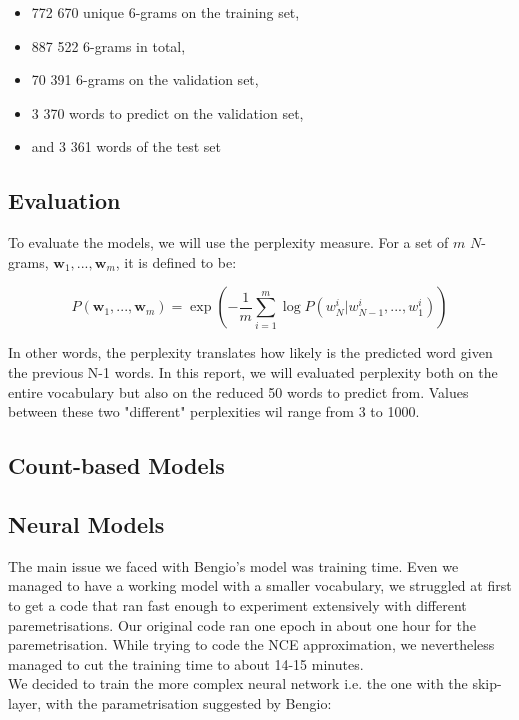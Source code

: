 \documentclass[11pt]{article}
\begin{document}
\begin{itemize}
\item 772 670 unique 6-grams on the training set,
\item 887 522 6-grams in total,
\item 70 391 6-grams on the validation set,
\item 3 370 words to predict on the validation set,
\item and 3 361 words of the test set
\end{itemize}

\subsection{Evaluation}

To evaluate the models, we will use the perplexity measure. For a set of $m$ $N$-grams, $\boldsymbol{w}_1,...,\boldsymbol{w}_m$, it is defined to be:

$$ P(\boldsymbol{w}_1,...,\boldsymbol{w}_m) = \exp\left(-\frac{1}{m} \sum\limits_{i = 1}^{m} \log P(w_N^i|w_{N-1}^i,...,w_1^i)\right)$$

\noindent In other words, the perplexity translates how likely is the predicted word given the previous N-1 words. In this report, we will evaluated perplexity both on the entire vocabulary but also on the reduced 50 words to predict from. Values between these two "different" perplexities wil range from 3 to 1000.
\subsection{Count-based Models}

\subsection{Neural Models}

The main issue we faced with Bengio's model was training time. Even we managed to have a working model with a smaller vocabulary, we struggled at first to get a code that ran fast enough to experiment extensively with different paremetrisations. Our original code ran one epoch in about one hour for the paremetrisation. While trying to code the NCE approximation, we nevertheless managed to cut the training time to about 14-15 minutes.\\

We decided to train the more complex neural network i.e. the one with the skip-layer, with the parametrisation suggested by Bengio:
\end{document}
